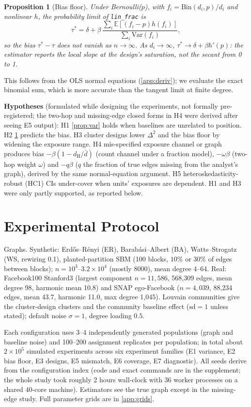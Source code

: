 \documentclass{article}
\theoremstyle{plain}
\newtheorem{proposition}{Proposition}
\theoremstyle{remark}
\newcommand{\E}{\mathbb{E}}
\newcommand{\Var}{\mathrm{Var}}
\newcommand{\dH}{d_{\mathrm H}}
\begin{document}
\begin{proposition}[Bias floor]\label{prop:bias}
Under Bernoulli($p$), with $f_i=\mathrm{Bin}(d_i,p)/d_i$ and nonlinear $h$, the probability limit of \texttt{lin\_frac} is
\[
\tau^\ast=\delta+\beta\,\frac{\sum_i\E[(f_i-p)h(f_i)]}{\sum_i\Var(f_i)},
\]
so the bias $\tau^\ast-\tau$ does not vanish as $n\to\infty$. As $d_i\to\infty$, $\tau^\ast\to\delta+\beta h'(p)$: the estimator reports the \emph{local} slope at the design's saturation, not the secant from 0 to 1.
\end{proposition}
This follows from the OLS normal equations (\cref{app:deriv}); we evaluate the exact binomial sum, which is more accurate than the tangent limit at finite degree.

\textbf{Hypotheses} (formulated while designing the experiments, not formally pre-registered; the two-hop and missing-edge closed forms in H4 were derived after seeing E5 output): H1 \cref{prop:var} holds when baselines are unrelated to position. H2 \cref{prop:bias} predicts the bias. H3 cluster designs lower $\Delta^2$ and the bias floor by widening the exposure range. H4 mis-specified exposure channel or graph produces bias $-\beta(1-\dH/\bar d)$ (count channel under a fraction model), $-\omega\beta$ (two-hop weight $\omega$) and $-q\beta$ ($q$ the fraction of true edges missing from the analyst's graph), derived by the same normal-equation argument. H5 heteroskedasticity-robust (HC1) CIs under-cover when units' exposures are dependent. H1 and H3 were only partly supported, as reported below.

\section{Experimental Protocol}\label{sec:protocol}
Graphs. Synthetic: Erd\H{o}s--R\'enyi (ER), Barab\'asi--Albert (BA), Watts--Strogatz (WS, rewiring 0.1), planted-partition SBM (100 blocks, $10\%$ or $30\%$ of edges between blocks); $n=10^3$--$3.2\times10^4$ (mostly 8000), mean degree 4--64. Real: Facebook100 Stanford3 \citep{traud2012,rossi2015} (largest component $n=11{,}586$, 568{,}309 edges, mean degree 98, harmonic mean 10.8) and SNAP ego-Facebook \citep{mcauley2012} ($n=4{,}039$, 88{,}234 edges, mean 43.7, harmonic 11.0, max degree 1{,}045). Louvain communities give the cluster-design clusters and the community baseline effect ($\mathrm{sd}=1$ unless stated); default noise $\sigma=1$, degree loading $0.5$.

Each configuration uses 3--4 independently generated populations (graph and baseline noise) and 100--200 assignment replicates per population; in total about $2\times10^5$ simulated experiments across six experiment families (E1 variance, E2 bias floor, E3 designs, E5 mismatch, E6 coverage, E7 diagnostic). All seeds derive from the configuration index (code and exact commands are in the supplement; the whole study took roughly 2 hours wall-clock with 36 worker processes on a shared 40-core machine). Estimators see the true graph except in the missing-edge study. Full parameter grids are in \cref{app:grids}.
\end{document}
